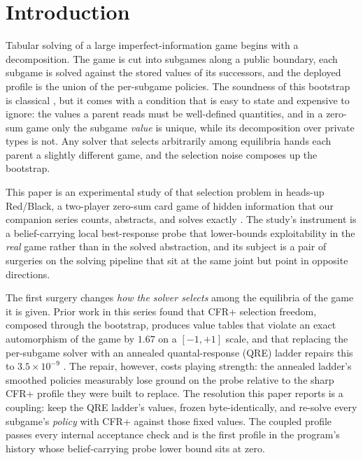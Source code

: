 \documentclass[11pt]{article}
\theoremstyle{plain}
\theoremstyle{definition}
\theoremstyle{remark}
\begin{document}
\section{Introduction}\label{sec:intro}

Tabular solving of a large imperfect-information game begins with a
decomposition. The game is cut into subgames along a public boundary,
each subgame is solved against the stored values of its successors, and
the deployed profile is the union of the per-subgame policies. The
soundness of this bootstrap is classical \cite{burch2014}, but it comes
with a condition that is easy to state and expensive to ignore: the
values a parent reads must be well-defined quantities, and in a zero-sum
game only the subgame \emph{value} is unique, while its decomposition
over private types is not. Any solver that selects arbitrarily among
equilibria hands each parent a slightly different game, and the
selection noise composes up the bootstrap.

This paper is an experimental study of that selection problem in
heads-up Red/Black, a two-player zero-sum card game of hidden
information that our companion series counts, abstracts, and solves
exactly \cite{rb1,rb2,rb3}. The study's instrument is a
belief-carrying local best-response probe that lower-bounds
exploitability in the \emph{real} game rather than in the solved
abstraction, and its subject is a pair of surgeries on the solving
pipeline that sit at the same joint but point in opposite directions.

The first surgery changes \emph{how the solver selects} among the
equilibria of the game it is given. Prior work in this series found that
CFR+ selection freedom, composed through the bootstrap, produces value
tables that violate an exact automorphism of the game by $1.67$ on a
$[-1,+1]$ scale, and that replacing the per-subgame solver with an
annealed quantal-response (QRE) ladder repairs this to $3.5\times10^{-9}$
\cite{rb2}. The repair, however, costs playing strength: the annealed
ladder's smoothed policies measurably lose ground on the probe relative
to the sharp CFR+ profile they were built to replace. The resolution
this paper reports is a coupling: keep the QRE ladder's values, frozen
byte-identically, and re-solve every subgame's \emph{policy} with CFR+
against those fixed values. The coupled profile passes every internal
acceptance check and is the first profile in the program's history whose
belief-carrying probe lower bound sits at zero.
\end{document}
